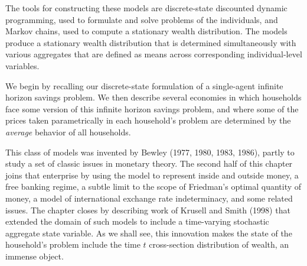 The tools for constructing these models are discrete-state
discounted dynamic programming, used to formulate and solve
problems of the individuals, and Markov chains, used to
compute a stationary wealth distribution. The models produce
a stationary wealth distribution that is determined
simultaneously with various aggregates that are defined
as means across corresponding individual-level variables.

We begin by recalling our discrete-state formulation of a
single-agent infinite horizon savings problem. We then describe
several economies in which  households face some version of
this infinite horizon savings problem, and where some of the
prices taken parametrically in each household's problem
are determined by the {\it average\/} behavior of
all households.%

   This class of models was invented by Bewley (1977, 1980, 1983, 1986),
partly to study a set of classic issues in monetary theory.
The second half of this chapter joins that enterprise by using
the model to represent inside and outside money, a free banking
regime, a subtle limit to the scope of Friedman's optimal quantity
of money, a model of international exchange rate indeterminacy,
and some related issues.  The chapter closes by describing work of Krusell and Smith (1998) that extended the domain
of such models to include a time-varying stochastic aggregate state
variable.  As we shall see, this innovation makes the state
of the household's problem include the time $t$ cross-section
distribution of wealth, an immense object.

